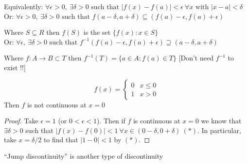 \documentclass[10pt,twoside]{scrartcl}
\begin{document}
Equivalently: $\forall \epsilon > 0,~ \exists \delta >0 \text{ such that } |f(x) - f(a)| < \epsilon ~ \forall x \text{ with } |x-a| < \delta$\\

Or: $\forall \epsilon > 0, ~ \exists \delta > 0 \text{ such that } f(a- \delta, a + \delta) \subseteq (f(a)- \epsilon, f(a) + \epsilon)$

Where $S\subseteq R$ then $f(S)$ is the set $\{f(x):x \in S\}$\\

Or: $\forall \epsilon,~\exists \delta >0 \text{ such that } f^{-1}(f(a) - \epsilon, f(a) + \epsilon) \supseteq (a - \delta, a + \delta)$

Where $f: A \to B \subset T$ then $f^{-1}(T) = \{a \in A:f(a) \in T\}$ [Don't need $f^{-1}$ to exist !!]\\


\begin{example}
\[f(x) = \begin{cases}
 0 & x \leq 0 \\
 1 & x > 0	
 \end{cases}
\]	 Then $f$ is not continuous at $x = 0$

\begin{proof}
Take $\epsilon = 1$ (or $0 < \epsilon < 1$). Then if $f$ is continuous at $x = 0$ we know that $\exists \delta > 0$ such that $|f(x) - f(0)| < 1~ \forall x \in (0 - \delta, 0 + \delta)~(*)$. In particular, take $x = \delta/2$ to find that $|1-0| < 1$ by 	$(*)$.
\end{proof}
\end{example}

``Jump discontinuity'' is another type of discontinuity\\
\end{document}
